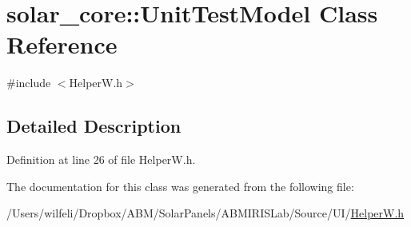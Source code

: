 \hypertarget{classsolar__core_1_1_unit_test_model}{}\section{solar\+\_\+core\+:\+:Unit\+Test\+Model Class Reference}
\label{classsolar__core_1_1_unit_test_model}


{\ttfamily \#include $<$Helper\+W.\+h$>$}



\subsection{Detailed Description}


Definition at line 26 of file Helper\+W.\+h.



The documentation for this class was generated from the following file\+:\begin{DoxyCompactItemize}
\item 
/\+Users/wilfeli/\+Dropbox/\+A\+B\+M/\+Solar\+Panels/\+A\+B\+M\+I\+R\+I\+S\+Lab/\+Source/\+U\+I/\hyperlink{_helper_w_8h}{Helper\+W.\+h}\end{DoxyCompactItemize}
